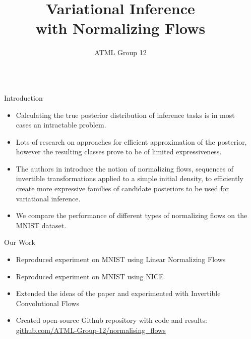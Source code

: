 \documentclass[final,hyperref={pdfpagelabels=false}]{beamer}
\title{\Huge Variational Inference\\ with Normalizing Flows} %
\author{ATML Group 12}
\institute{Department of Computer Science, University of Oxford\\\vspace{4mm}
\texttt{1032626, 1034125, 1034129, 1036969}}
\newcommand{\shrink}{-15pt}
\begin{document}

\begin{frame}[t] %

\begin{columns}[t] %

  \begin{column}{.02\textwidth}\end{column} %


  \begin{column}{.3\textwidth} %

    \vspace{\shrink}          
    \begin{block}{Introduction}
      \begin{itemize}
          \item Calculating the true posterior distribution of inference tasks is in most cases an intractable problem.
          \item Lots of research on approaches for efficient approximation of the posterior, however the resulting classes prove to be of limited expressiveness.
          \item The authors in \cite{flows} introduce the notion of normalizing flows, sequences of invertible transformations applied to a simple initial density, to efficiently create more expressive families of candidate posteriors to be used for variational inference.
          \item We compare the performance of different types of normalizing flows on the MNIST dataset.
      \end{itemize}


    \end{block}

    \begin{block}{Our Work}
      \begin{itemize}
          \item Reproduced experiment on MNIST using Linear Normalizing Flows
          \item Reproduced experiment on MNIST using NICE
          \item Extended the ideas of the paper and experimented with Invertible Convolutional Flows
          \item Created open-source Github repository with code and results: \url{github.com/ATML-Group-12/normalising_flows} 
      \end{itemize}
    \end{block}


\end{column}
\end{columns}
\end{frame}
\end{document}
